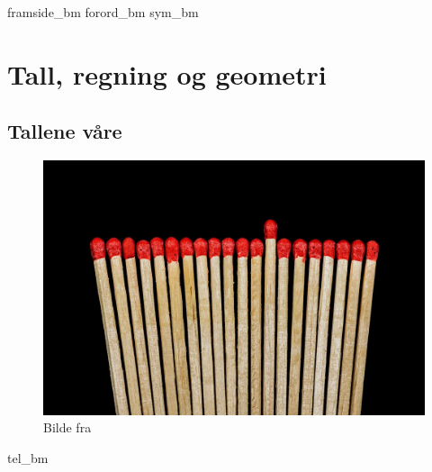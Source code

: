 




{framside_bm}
{forord_bm}
{sym_bm}
\newpage

{\footnotesize \tableofcontents}
\newpage
\part{Tall, regning og geometri}

\chapter{Tallene våre \label{Talavare}}
\begin{figure}
	\centering
	\includegraphics[scale=0.25]{sticks} \\
	{\footnotesize Bilde fra } 
\end{figure}
\newpage
{tel_bm}

